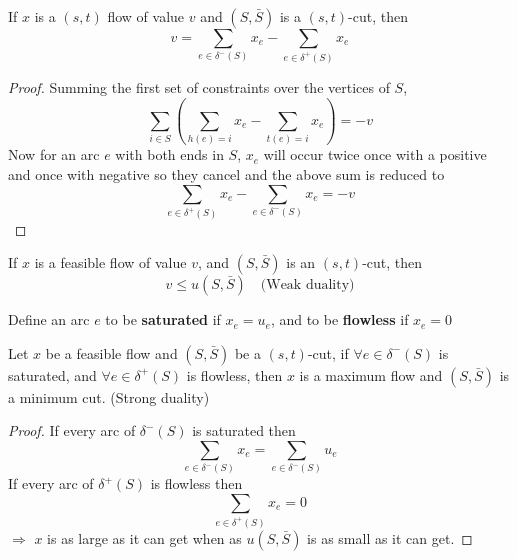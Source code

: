 			\begin{lemma}
				If $x$ is a $(s, t)$ flow of value $v$ and $(S, \bar{S})$ is a $(s, t)$-cut, then
				\begin{equation}
					v = \sum_{e\in \delta^-(S)} x_e - \sum_{e\in \delta^+(S)} x_e
				\end{equation}
			\end{lemma}

			\begin{proof}
				Summing the first set of constraints over the vertices of $S$,
				\begin{equation}
					\sum_{i\in S} (\sum_{h(e) = i}x_e - \sum_{t(e) = i}x_e) = -v
				\end{equation}
				Now for an arc $e$ with both ends in $S$, $x_e$ will occur twice once with a positive and once with negative so they cancel and the above sum is reduced to
				\begin{equation}
					\sum_{e\in \delta^+(S)}x_e - \sum_{e \in \delta^-(S)}x_e = -v
				\end{equation}
			\end{proof}


			\begin{corollary}
				If $x$ is a feasible flow of value $v$, and $(S, \bar{S})$ is an $(s, t)$-cut, then
				\begin{equation}
					v \le u(S, \bar{S}) \quad \text{(Weak duality)}
				\end{equation}
			\end{corollary}

			\begin{definition}
				Define an arc $e$ to be \textbf{saturated} if $x_e = u_e$, and to be \textbf{flowless} if $x_e = 0$
			\end{definition}

			\begin{corollary}
				Let $x$ be a feasible flow and $(S, \bar{S})$ be a $(s, t)$-cut, if $\forall e\in \delta^-(S)$ is saturated, and $\forall e\in \delta^+(S)$ is flowless, then $x$ is a maximum flow and $(S, \bar{S})$ is a minimum cut. (Strong duality)
			\end{corollary}

			\begin{proof}
				If every arc of $\delta^-(S)$ is saturated then
				\begin{equation}
					\sum_{e\in \delta^-(S)}x_e = \sum_{e\in \delta^-(S)}u_e
				\end{equation}
				If every arc of $\delta^+(S)$ is flowless then
				\begin{equation}
					\sum_{e\in \delta^+(S)}x_e = 0
				\end{equation}
				$\Rightarrow$ $x$ is as large as it can get when as $u(S, \bar{S})$ is as small as it can get.
			\end{proof}

